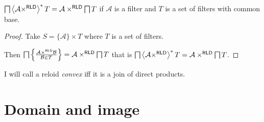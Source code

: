 \begin{cor}
$\bigsqcap\left\langle \mathcal{A}\times^{\mathsf{RLD}}\right\rangle ^{\ast}T=\mathcal{A}\times^{\mathsf{RLD}}\bigsqcap T$
if $\mathcal{A}$ is a filter and $T$ is a set of filters with common
base.\end{cor}
\begin{proof}
Take $S=\{\mathcal{A}\}\times T$ where $T$ is a set of filters.

Then $\bigsqcap\left\{ \frac{\mathcal{A}\times^{\mathsf{RLD}}\mathcal{B}}{\mathcal{B}\in T}\right\}=\mathcal{A}\times^{\mathsf{RLD}}\bigsqcap T$
that is $\bigsqcap\left\langle \mathcal{A}\times^{\mathsf{RLD}}\right\rangle ^{\ast}T=\mathcal{A}\times^{\mathsf{RLD}}\bigsqcap T$.\end{proof}
\begin{defn}
I will call a reloid \emph{convex} iff it is
a join of direct products.
\end{defn}

\section{Domain and image}

